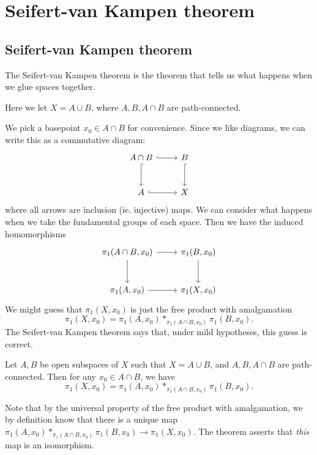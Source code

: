 \documentclass[a4paper]{article}
\begin{document}
\section{Seifert-van Kampen theorem}
\subsection{Seifert-van Kampen theorem}
The Seifert-van Kampen theorem is the theorem that tells us what happens when we glue spaces together.

Here we let $X = A\cup B$, where $A, B, A\cap B$ are path-connected.
\begin{center}
\end{center}
We pick a basepoint $x_0 \in A\cap B$ for convenience. Since we like diagrams, we can write this as a commutative diagram:
\[
  \begin{tikzcd}[row sep=large]
    A\cap B \ar [r, hook] \ar[d, hook] & B\ar[d, hook]\\
    A \ar [r, hook] & X
  \end{tikzcd}
\]
where all arrows are inclusion (ie. injective) maps. We can consider what happens when we take the fundamental groups of each space. Then we have the induced homomorphisms
\[
  \begin{tikzcd}[row sep=large]
    \pi_1(A\cap B, x_0) \ar [r] \ar[d] & \pi_1(B, x_0)\ar[d]\\
    \pi_1(A, x_0) \ar [r] & \pi_1(X, x_0)
  \end{tikzcd}
\]
We might guess that $\pi_1(X, x_0)$ is just the free product with amalgamation
\[
  \pi_1(X, x_0) = \pi_1(A, x_0) *_{\pi_1(A\cap B, x_0)} \pi_1(B, x_0).
\]
The Seifert-van Kampen theorem says that, under mild hypotheses, this guess is correct.

\begin{thm}
  Let $A, B$ be open subspaces of $X$ such that $X = A\cup B$, and $A, B, A\cap B$ are path-connected. Then for any $x_0 \in A\cap B$, we have
  \[
    \pi_1(X, x_0) = \pi_1(A, x_0) *_{\pi_1(A\cap B, x_0)} \pi_1(B, x_0).
  \]
\end{thm}
Note that by the universal property of the free product with amalgamation, we by definition know that there is a unique map $\pi_1(A, x_0) *_{\pi_1(A\cap B, x_0)} \pi_1(B, x_0) \to \pi_1(X, x_0)$. The theorem asserts that \emph{this} map is an isomorphism.
\end{document}
